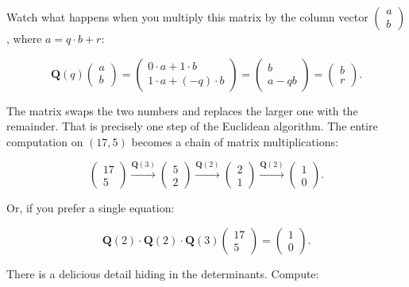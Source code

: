 \documentclass[11pt,twoside,openright]{book}
\theoremstyle{definition}
\theoremstyle{remark}
\begin{document}
Watch what happens when you multiply this matrix by the column vector $\begin{pmatrix} a \\ b \end{pmatrix}$, where $a = q \cdot b + r$:

\[\mathbf{Q}(q) \begin{pmatrix} a \\ b \end{pmatrix} = \begin{pmatrix} 0 \cdot a + 1 \cdot b \\ 1 \cdot a + (-q) \cdot b \end{pmatrix} = \begin{pmatrix} b \\ a - qb \end{pmatrix} = \begin{pmatrix} b \\ r \end{pmatrix}.\]

The matrix swaps the two numbers and replaces the larger one with the remainder. That is precisely one step of the Euclidean algorithm. The entire computation on $(17, 5)$ becomes a chain of matrix multiplications:

\[\begin{pmatrix} 17 \\ 5 \end{pmatrix} \xrightarrow{\mathbf{Q}(3)} \begin{pmatrix} 5 \\ 2 \end{pmatrix} \xrightarrow{\mathbf{Q}(2)} \begin{pmatrix} 2 \\ 1 \end{pmatrix} \xrightarrow{\mathbf{Q}(2)} \begin{pmatrix} 1 \\ 0 \end{pmatrix}.\]

Or, if you prefer a single equation:

\[\mathbf{Q}(2) \cdot \mathbf{Q}(2) \cdot \mathbf{Q}(3) \begin{pmatrix} 17 \\ 5 \end{pmatrix} = \begin{pmatrix} 1 \\ 0 \end{pmatrix}.\]


There is a delicious detail hiding in the determinants. Compute:
\end{document}
